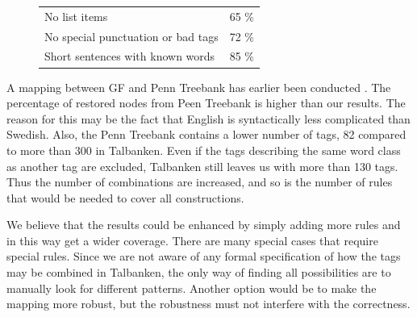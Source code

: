 \documentclass{report}
\begin{document}
\begin{figure}[h]
\begin{tabular}{|ll|}
\hline
No list items & 65 \%\\
No special punctuation or bad tags& 72 \%\\
Short sentences with known words & 85 \%\\
\hline
\end{tabular}
\caption{}
\label{tab:mappres}
\end{figure}

A mapping between GF and Penn Treebank has earlier been conducted \cite{gfMech}.
The percentage of restored nodes from Peen Treebank is higher than our results.
The reason for this may be the fact that English is syntactically less complicated
than Swedish. Also, the Penn Treebank contains a lower number of tags, 82 compared
to more than 300 in Talbanken. Even if the tags describing the same word
class as another tag are excluded, Talbanken still leaves us with more than 130 tags.
Thus the number of combinations are increased, and so is the number of
rules that would be needed to cover all constructions.

We believe that the results could be enhanced by simply adding more rules 
and in this way get a wider coverage. There are many special cases that require
special rules. Since we are not aware of any formal specification of how the tags may be
combined in Talbanken, the only way of finding all possibilities are to manually look
for different patterns. Another option would be to make the mapping more
robust, but the robustness must not interfere with the correctness.



\end{document}
